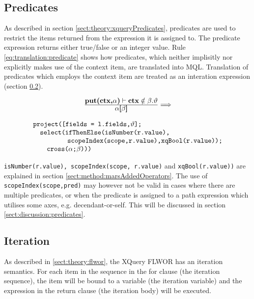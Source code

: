 \subsection{Predicates}
As described in section \ref{sect:theory:xqueryPredicates}, predicates are used
to restrict the items returned from the expression it is assigned to. The
predicate expression returns either true/false or an integer value. Rule
\ref{eq:translation:predicate} shows how predicates, which neither implisitly
nor explicitly makes use of the context item, are translated into MQL.
Translation of predicates which employs the context item are treated as an
interation expression (section \ref{sect:translation:iteration}).

\begin{equation}
\centering
\begin{array}{c}
	\frac{\displaystyle \textbf{put(ctx,}\alpha\textbf{)}\vdash\textbf{ctx}\notin\beta.\vartheta}
	{\displaystyle \alpha\textsf{[}\beta\textsf{]}}

	\Longrightarrow 
	\\
	\mbox{}
	\\
	\begin{array}{l}
		\mbox{\texttt{project([fields = l.fields,}} \vartheta \mbox{\texttt{];}} 
		\\ \quad \mbox{\texttt{select(ifThenElse(isNumber(r.value),}} \\ \quad 
		\qquad\qquad \mbox{\texttt{scopeIndex(scope,r.value),xqBool(r.value));}} \\ \quad\quad
		\mbox{\texttt{cross(}} 
		\alpha \texttt{;}
		\beta \mbox{\texttt{)))}}
	\end{array}
\end{array}
\label{eq:translation:predicate}
\end{equation}


\texttt{isNumber(r.value), scopeIndex(scope, r.value)} and \texttt{xqBool(r.value))} are explained in section
\ref{sect:method:marsAddedOperators}. The use of \texttt{scopeIndex(scope,pred)} may however not be valid in cases
where there are multiple predicates, or when the predicate is assigned to a path expression which utilises some
axes, e.g. \textsf{decendant-or-self}. This will be discussed in section \ref{sect:discussion:predicates}.


\subsection{Iteration}
\label{sect:translation:iteration}
As described in \ref{sect:theory:flwor}, the XQuery FLWOR has an iteration semantics. For each item in the
sequence in the \textsf{for} clause (the iteration sequence), the item will be bound to a variable (the iteration
variable) and the expression in the \textsf{return} clause (the iteration body) will be executed.

